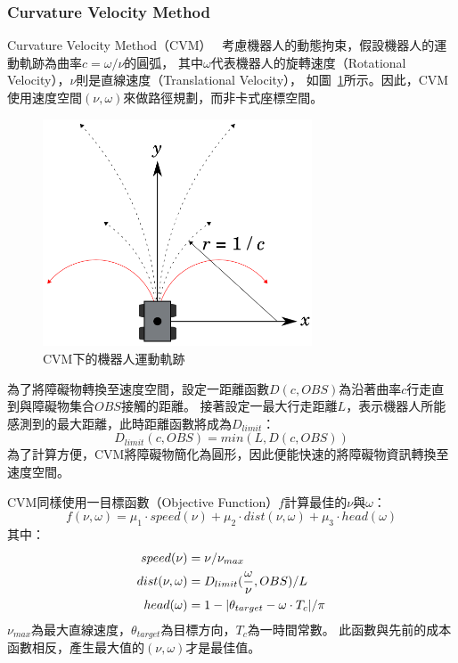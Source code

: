 \subsubsection{Curvature Velocity Method}
Curvature Velocity Method（CVM）~\cite{Simmons:1996:CVM}
考慮機器人的動態拘束，假設機器人的運動軌跡為曲率$c=\omega/\nu$的圓弧，
其中$\omega$代表機器人的旋轉速度（Rotational Velocity），$\nu$則是直線速度（Translational Velocity），
如圖~\ref{f:cvm_curvature}所示。因此，CVM使用速度空間$(\nu,\omega)$來做路徑規劃，而非卡式座標空間。
\begin{figure}
	\centering
	\includegraphics[width=8cm]{figures/CVM1}
	\caption{CVM下的機器人運動軌跡}
	\label{f:cvm_curvature}
\end{figure}

為了將障礙物轉換至速度空間，設定一距離函數$D(c,OBS)$為沿著曲率$c$行走直到與障礙物集合$OBS$接觸的距離。
接著設定一最大行走距離$L$，表示機器人所能感測到的最大距離，此時距離函數將成為$D_{limit}$：
\begin{equation}
	D_{limit}(c,OBS) = min(L,D(c,OBS))
\end{equation}
為了計算方便，CVM將障礙物簡化為圓形，因此便能快速的將障礙物資訊轉換至速度空間。

CVM同樣使用一目標函數（Objective Function）$f$計算最佳的$\nu$與$\omega$：
\begin{equation}
	f(\nu,\omega) = \mu_1 \cdot speed(\nu) + \mu_2 \cdot dist(\nu,\omega) + \mu_3 \cdot head(\omega)
\end{equation}
其中：
\begin{align*}
	speed(\nu)	&= \nu / \nu_{max} \\ 
	dist(\nu,\omega)	&= D_{limit}({\omega \over \nu},OBS) / L \\
	head(\omega)	&= 1 - |\theta_{target} - \omega \cdot T_{c} | / \pi \\
\end{align*}
$\nu_{max}$為最大直線速度，$\theta_{target}$為目標方向，$T_c$為一時間常數。
此函數與先前的成本函數相反，產生最大值的$(\nu,\omega)$才是最佳值。

